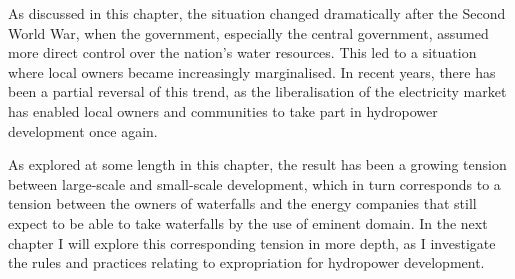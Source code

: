As discussed in this chapter, the situation changed dramatically after the Second World War, when the government, especially the central government, assumed more direct control over the nation's water resources. This led to a situation where local owners became increasingly marginalised. In recent years, there has been a partial reversal of this trend, as the liberalisation of the electricity market has enabled local owners and communities to take part in hydropower development once again.

As explored at some length in this chapter, the result has been a growing tension between large-scale and small-scale development, which in turn corresponds to a tension between the owners of waterfalls and the energy companies that still expect to be able to take waterfalls by the use of eminent domain. In the next chapter I will explore this corresponding tension in more depth, as I investigate the rules and practices relating to expropriation for hydropower development.

